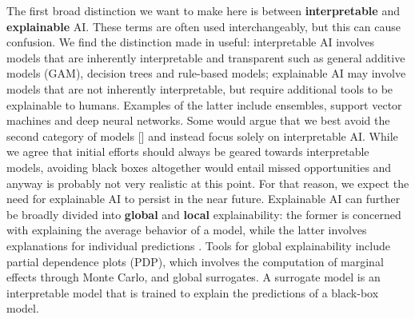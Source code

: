 \documentclass{juliacon}
\begin{document}
The first broad distinction we want to make here is between
\textbf{interpretable} and \textbf{explainable} AI. These terms are
often used interchangeably, but this can cause confusion. We find the
distinction made in \cite{rudin2019stop} useful: interpretable AI
involves models that are inherently interpretable and transparent such
as general additive models (GAM), decision trees and rule-based models;
explainable AI may involve models that are not inherently interpretable,
but require additional tools to be explainable to humans. Examples of
the latter include ensembles, support vector machines and deep neural
networks. Some would argue that we best avoid the second category of
models {[}\cite{rudin2019stop}{]} and instead focus solely on
interpretable AI. While we agree that initial efforts should always be
geared towards interpretable models, avoiding black boxes altogether
would entail missed opportunities and anyway is probably not very
realistic at this point. For that reason, we expect the need for
explainable AI to persist in the near future. Explainable AI can further
be broadly divided into \textbf{global} and \textbf{local}
explainability: the former is concerned with explaining the average
behavior of a model, while the latter involves explanations for
individual predictions \cite{molnar2020interpretable}. Tools for global
explainability include partial dependence plots (PDP), which involves
the computation of marginal effects through Monte Carlo, and global
surrogates. A surrogate model is an interpretable model that is trained
to explain the predictions of a black-box model.
\end{document}

